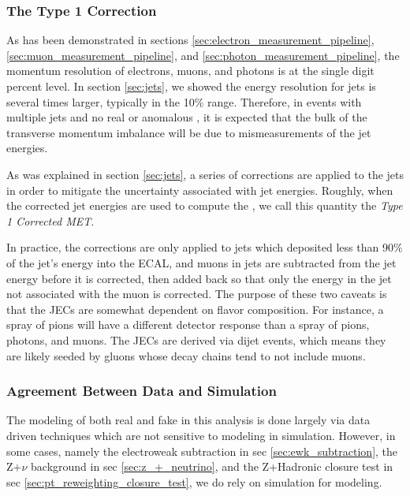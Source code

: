     \subsubsection{The Type 1 Correction} 
      As has been demonstrated in sections \ref{sec:electron_measurement_pipeline}, \ref{sec:muon_measurement_pipeline}, and \ref{sec:photon_measurement_pipeline}, the momentum resolution of electrons, muons, and photons is at the single digit percent level. In section \ref{sec:jets}, we showed the energy resolution for jets is several times larger, typically in the 10\% range. Therefore, in events with multiple jets and no real or anomalous \MET, it is expected that the bulk of the transverse momentum imbalance will be due to mismeasurements of the jet energies. 

      As was explained in section \ref{sec:jets}, a series of corrections are applied to the jets in order to mitigate the uncertainty associated with jet energies. Roughly, when the corrected jet energies are used to compute the \MET, we call this quantity the \emph{Type 1 Corrected MET}. 

      In practice, the corrections are only applied to jets which deposited less than 90\% of the jet's energy into the ECAL, and muons in jets are subtracted from the jet energy before it is corrected, then added back so that only the energy in the jet not associated with the muon is corrected. The purpose of these two caveats is that the JECs are somewhat dependent on flavor composition. For instance, a spray of pions will have a different detector response than a spray of pions, photons, and muons. The JECs are derived via dijet events, which means they are likely seeded by gluons whose decay chains tend to not include muons.


    \subsubsection{Agreement Between Data and Simulation}

      The modeling of both real and fake \MET in this analysis is done largely via data driven techniques which are not sensitive to \MET modeling in simulation. However, in some cases, namely the electroweak subtraction in sec \ref{sec:ewk_subtraction}, the Z$+\nu$ background in sec \ref{sec:z_+_neutrino}, and the Z+Hadronic closure test in sec \ref{sec:pt_reweighting_closure_test}, we do rely on simulation for \MET modeling.

